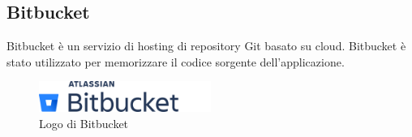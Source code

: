 \subsection{Bitbucket}
Bitbucket è un servizio di hosting di repository Git basato su cloud. Bitbucket è stato utilizzato per memorizzare il codice sorgente dell'applicazione.

\begin{figure}[h]
  \centering
  \includegraphics[width=0.5\textwidth]{img/tecnologie/bitbucket.png}
  \caption{Logo di Bitbucket}
  \label{fig:bitbucket}
\end{figure}